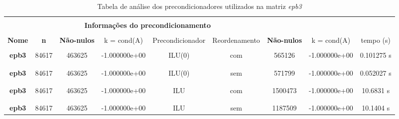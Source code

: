 
\begin{table}[ht]
    \centering
    \begin{tabular}{|c|c|c|c|c|c|c|c|c|}
        \hline \rowcolor{Gray}
        \multicolumn{9}{|c|}{\bfseries Tabela de analise dos precondicionadores }\\
        \hline \rowcolor{Gray}  \multicolumn{4}{|c|}{} & \multicolumn{5}{|c|}{} \\
         [-1em]  \rowcolor{Gray}
         \multicolumn{4}{|c|}{\bfseries Informações da matriz } & \multicolumn{5}{|c|}{\bfseries Informações do precondicionamento }\\
         \hline \rowcolor{Gray} & & & & & & & &  \\
         [-1em]
         \rowcolor{Gray}
         \bfseries Nome & \bfseries n & \bfseries Não-nulos &  
         k = cond(A) & Precondicionador & Reordenamento &
         \bfseries Não-nulos &  
         k = cond(A)  & tempo (s) \\
         \hline \\
         [-1em] \bfseries epb3 & 84617 & 463625 & -1.000000e+00 & ILU(0) & com & 565126 & -1.000000e+00 & 0.101275 s \\ & & & & & & & &  \\ [-1em] \hline \\
         [-1em] \bfseries epb3 & 84617 & 463625 & -1.000000e+00 & ILU(0) & sem & 571799 & -1.000000e+00 & 0.052027 s \\ & & & & & & & & \\ [-1em] \hline \\
         [-1em] \bfseries epb3 & 84617 & 463625 & -1.000000e+00 & ILU & com & 1500473 & -1.000000e+00 & 10.6831 s \\ & & & & & & & & \\ [-1em] \hline \\
         [-1em] \bfseries epb3 & 84617 & 463625 & -1.000000e+00 & ILU & sem & 1187509 & -1.000000e+00 & 10.1404 s \\ \hline
    \end{tabular}
    \caption{Tabela de análise dos precondicionadores utilizados na matriz \textit{epb3}}
    \label{tab:precond-epb}
\end{table}


